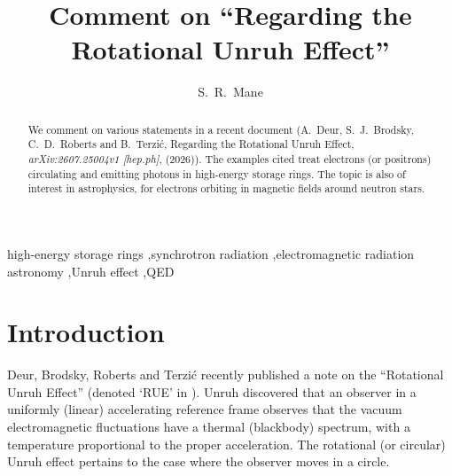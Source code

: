 \documentclass[review]{elsarticle}
\theoremstyle{plain}
\begin{document}

\begin{frontmatter}

\title{Comment on ``Regarding the Rotational Unruh Effect''}

\author[cc]{S.~R.~Mane}
\address[cc]{Convergent Computing Inc., P.~O.~Box 561, Shoreham, NY 11786, USA}

\begin{abstract}
We comment on various statements in a recent document 
(A.~Deur, S.~J.~Brodsky, C.~D.~Roberts and B.~Terzi{\'c},
Regarding the Rotational Unruh Effect,
\textit{arXiv:2607.25004v1 [hep.ph]}, (2026)).
The examples cited treat electrons (or positrons) circulating and emitting photons in high-energy storage rings.
The topic is also of interest in astrophysics, for electrons orbiting in magnetic fields around neutron stars.
\end{abstract}

\begin{keyword}
  high-energy storage rings
  \sep synchrotron radiation
  \sep electromagnetic radiation astronomy
  \sep Unruh effect
  \sep QED
\end{keyword}

\end{frontmatter}

\setcounter{equation}{0}
\section{Introduction}\label{sec:intro}
Deur, Brodsky, Roberts and Terzi{\'c} \cite{RUE} recently published a note on the ``Rotational Unruh Effect'' 
(denoted `RUE' in \cite{RUE}).
Unruh \cite{Unruh} discovered that an observer in a uniformly (linear) accelerating reference frame
observes that the vacuum electromagnetic fluctuations have a thermal (blackbody) spectrum, with a temperature proportional to the proper acceleration.
The rotational (or circular) Unruh effect pertains to the case where the observer moves in a circle.
\end{document}
